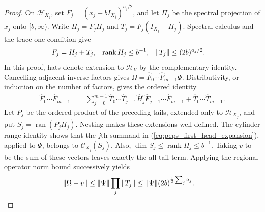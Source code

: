 \begin{proof}
    On $\mathcal H_{X_j}$, set $F_j=(x_j+bI_{X_j})^{a_j/2}$, and let
    $\Pi_j$ be the spectral projection of $x_j$ onto $[b,\infty)$.
    Write $H_j=F_j\Pi_j$ and $T_j=F_j(I_{X_j}-\Pi_j)$. Spectral calculus
    and the trace-one condition give
    \begin{align}
        F_j                    & =H_j+T_j,                &
        \operatorname{rank}H_j & \le b^{-1},              &
        \|T_j\|                & \le (2b)^{a_j/2}. \notag
    \end{align}
    In this proof, hats denote extension to $\mathcal H_V$ by the
    complementary identity. Cancelling adjacent inverse factors gives
    $\Omega=\widehat F_0\cdots\widehat F_{m-1}\Psi$. Distributivity,
    or induction on the number of factors, gives the ordered identity
    \begin{align}
        \widehat F_0\cdots\widehat F_{m-1}
         & =\sum_{j=0}^{m-1}
        \widehat T_0\cdots\widehat T_{j-1}\widehat H_j
        \widehat F_{j+1}\cdots\widehat F_{m-1}
        +\widehat T_0\cdots\widehat T_{m-1}.
        \label{eq:peps_first_head_expansion}
    \end{align}
    Let $P_j$ be the ordered product of the preceding tails, extended
    only to $\mathcal H_{X_j}$, and put $S_j=\operatorname{ran}(P_jH_j)$.
    Nesting makes these extensions well defined. The cylinder range
    identity shows that the $j$th summand in
    (\ref{eq:peps_first_head_expansion}), applied to $\Psi$, belongs to
    $\mathcal C_{X_j}(S_j)$. Also,
    $\dim S_j\le\operatorname{rank}H_j\le b^{-1}$.
    Taking $v$ to be the sum of these vectors leaves exactly the all-tail
    term. Applying the regional operator norm bound successively yields
    \begin{align}
        \|\Omega-v\|
         & \le \|\Psi\|\prod_j\|T_j\|
        \le \|\Psi\|(2b)^{\frac12\sum_j a_j}. \notag
    \end{align}
\end{proof}
